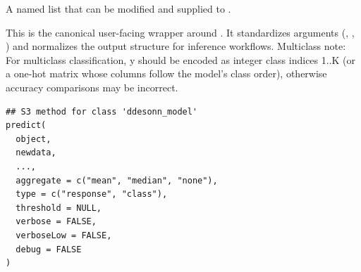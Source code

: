 \documentclass[a4paper]{book}
\begin{document}
%
\begin{Value}
A named list that can be modified and supplied to .
\end{Value}
%
\begin{Examples}
\end{Examples}
%
\begin{Description}
This is the canonical user-facing wrapper around . It
standardizes arguments (, , ) and normalizes the
output structure for inference workflows.
Multiclass note: For multiclass classification, y should be encoded as integer class indices 1..K (or a one-hot matrix whose columns follow the model’s class order), otherwise accuracy comparisons may be incorrect.
\end{Description}
%
\begin{Usage}
\begin{verbatim}
## S3 method for class 'ddesonn_model'
predict(
  object,
  newdata,
  ...,
  aggregate = c("mean", "median", "none"),
  type = c("response", "class"),
  threshold = NULL,
  verbose = FALSE,
  verboseLow = FALSE,
  debug = FALSE
)
\end{verbatim}
\end{Usage}
%
\end{document}

